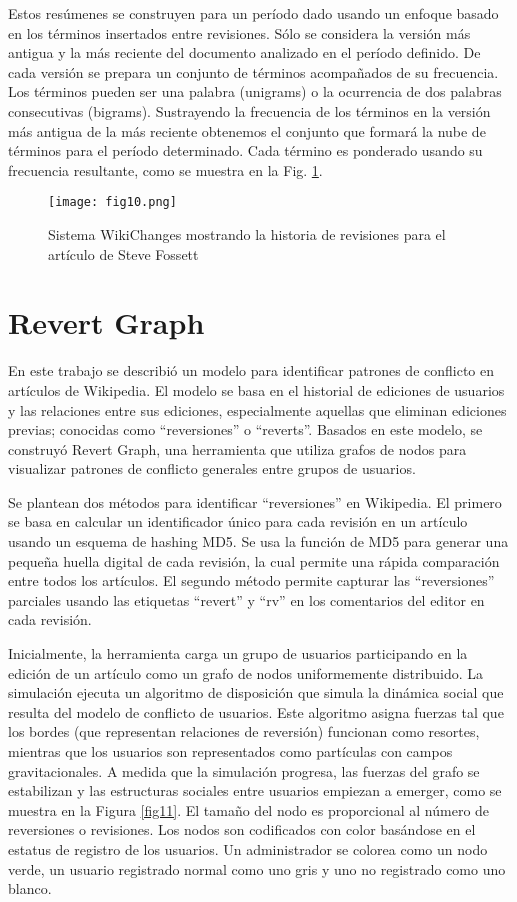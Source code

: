 Estos resúmenes se construyen para un período dado usando un enfoque basado en los términos insertados entre revisiones. Sólo se considera la versión más antigua y la más reciente del documento analizado en el período definido. De cada versión se prepara un conjunto de términos acompañados de su frecuencia. Los términos pueden ser una palabra (unigrams) o  la ocurrencia de dos palabras consecutivas (bigrams). Sustrayendo la frecuencia de los términos en la versión más antigua de la más reciente obtenemos el conjunto que formará la nube de términos para el período determinado. Cada término es ponderado usando su frecuencia resultante, como se muestra en la Fig. \ref{fig10}.

\begin{figure}[ht]
  \centering
  \texttt{[image: fig10.png]}
  \caption{Sistema WikiChanges mostrando la historia de revisiones para el artículo de Steve Fossett}
  \label{fig10}
\end{figure}

\section{Revert Graph}
En este trabajo se describió un modelo para identificar patrones de conflicto en artículos de Wikipedia. El modelo se basa en el historial de ediciones de usuarios y las relaciones entre sus ediciones, especialmente aquellas que eliminan ediciones previas; conocidas como “reversiones” o “reverts”. Basados en este modelo, se construyó Revert Graph, una herramienta que utiliza grafos de nodos para visualizar patrones de conflicto generales entre grupos de usuarios.
 
Se plantean dos métodos para identificar “reversiones” en Wikipedia. El primero se basa en calcular un identificador único para cada revisión en un artículo usando un esquema de hashing MD5. Se usa la función de MD5 para generar una pequeña huella digital de cada revisión, la cual permite una rápida comparación entre todos los artículos. El segundo método permite capturar las “reversiones” parciales usando las etiquetas “revert” y “rv” en los comentarios del editor en cada revisión.

Inicialmente, la herramienta carga un grupo de usuarios participando en la edición de un artículo como un grafo de nodos uniformemente distribuido. La simulación ejecuta un algoritmo de disposición que simula la dinámica social que resulta del modelo de conflicto de usuarios. Este algoritmo asigna fuerzas tal que los bordes (que representan relaciones de reversión) funcionan como resortes, mientras que los usuarios son representados como partículas con campos gravitacionales. A medida que la simulación progresa, las fuerzas del grafo se estabilizan y las estructuras sociales entre usuarios empiezan a emerger, como se muestra en la Figura \ref{fig11}. El tamaño del nodo es proporcional al número de reversiones o revisiones. Los nodos son codificados con color basándose en el estatus de registro de los usuarios. Un administrador se colorea como un nodo verde, un usuario registrado normal como uno gris y uno no registrado como uno blanco.

